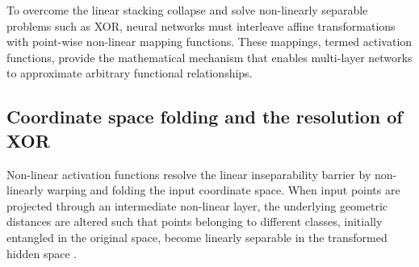 \documentclass[../../../main.tex]{subfiles}
\begin{document}
To overcome the linear stacking collapse and solve non-linearly separable problems such as XOR, neural networks must interleave affine transformations with point-wise non-linear mapping functions. These mappings, termed activation functions, provide the mathematical mechanism that enables multi-layer networks to approximate arbitrary functional relationships.

\subsection{Coordinate space folding and the resolution of XOR}
\label{subsec:coordinate_space_folding}

Non-linear activation functions resolve the linear inseparability barrier by non-linearly warping and folding the input coordinate space. When input points are projected through an intermediate non-linear layer, the underlying geometric distances are altered such that points belonging to different classes, initially entangled in the original space, become linearly separable in the transformed hidden space \citep{goodfellow2016}.
\end{document}
